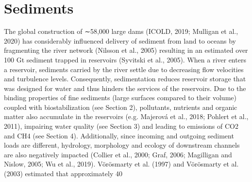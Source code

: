 \section{Sediments}
\label{sec:1}
The global construction of ∼58,000 large dams (ICOLD, 2019; Mulligan et al., 2020) has considerably influenced delivery of sediment from land to oceans by fragmenting the river network (Nilsson et al., 2005) resulting in an estimated over 100 Gt sediment trapped in reservoirs (Syvitski et al., 2005). When a river enters a reservoir, sediments carried by the river settle due to decreasing flow velocities and turbulence levels. Consequently, sedimentation reduces reservoir storage that was designed for water and thus hinders the services of the reservoirs. Due to the binding properties of fine sediments (large surfaces compared to their volume) coupled with biostabilization (see Section 2), pollutants, nutrients and organic matter also accumulate in the reservoirs (e.g. Majerová et al., 2018; Pohlert et al., 2011), impairing water quality (see Section 3) and leading to emissions of CO2 and CH4 (see Section 4). Additionally, since incoming and outgoing sediment loads are different, hydrology, morphology and ecology of downstream channels are also negatively impacted (Collier et al., 2000; Graf, 2006; Magilligan and Nislow, 2005; Wu et al., 2019). Vörösmarty et al. (1997) and Vörösmarty et al. (2003) estimated that approximately 40%
